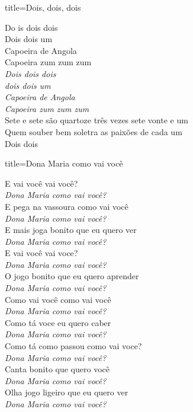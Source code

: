 \documentclass[fontsize=14pt, twoside]{scrreprt}
\begin{document}
\begin{multicols*}{2}
\begin{song}{title={Dois, dois, dois}}
        \begin{verse*}
            Do is dois dois\\
            Dois dois um\\
            Capoeira de Angola\\
            Capoeira zum zum zum\\
            \textit{Dois dois dois}\\
            \textit{dois dois um}\\
            \textit{Capoeira de Angola}\\
            \textit{Capoeira zum zum zum}\\
            Sete e sete são quartoze três vezes sete vonte e um\\
            Quem souber bem soletra as paixões de cada um\\
            Dois dois\\
        \end{verse*}
\end{song}


\begin{song}{title={Dona Maria como vai você}}
        \begin{verse*}
            E vai você vai você?\\
            \textit{Dona Maria como vai você?}\\
            E pega na vassoura como vai você\\
            \textit{Dona Maria como vai você?}\\
            E mais joga bonito que eu quero ver\\
            \textit{Dona Maria como vai você?}\\
            E vai você vai voce?\\
            \textit{Dona Maria como vai você?}\\
            O jogo bonito que eu quero aprender\\
            \textit{Dona Maria como vai você?}\\
            Como vai você como vai você\\
            \textit{Dona Maria como vai você?}\\
            Como tá voce eu quero caber\\
            \textit{Dona Maria como vai você?}\\
            Como tá como passou como vai voce?\\
            \textit{Dona Maria como vai você?}\\
            Canta bonito que quero você\\
            \textit{Dona Maria como vai você?}\\
            Olha jogo ligeiro que eu quero ver\\
            \textit{Dona Maria como vai você?}\\
        \end{verse*}
\end{song}


\end{multicols*}
\end{document}

